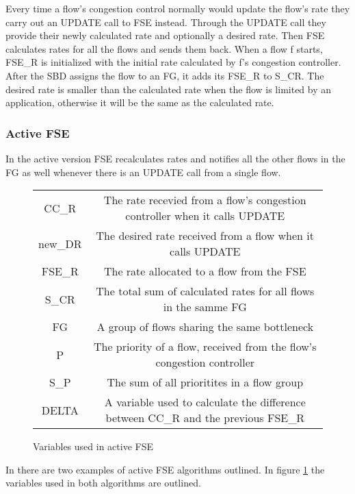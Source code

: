 \documentclass[UKenglish]{ifimaster}
\begin{document}
Every time a flow's congestion control normally would update the flow's rate they carry out an UPDATE call to FSE instead. 
Through the UPDATE call they provide their newly calculated rate and optionally a desired rate. 
Then FSE calculates rates for all the flows and sends them back. 
When a flow f starts, FSE\_R is initialized with the initial rate calculated by f's congestion controller. 
After the SBD assigns the flow to an FG, it adds its FSE\_R to S\_CR.
The desired rate is smaller than the calculated rate when the flow is limited by an application, otherwise it will be the same as the calculated rate.

\subsubsection{Active FSE}
In the active version FSE recalculates rates and notifies all the other flows in the FG as well whenever there is an UPDATE call from a single flow. 

\begin{figure}
\begin{center}
    \begin{tabular}{|c|c|}
        \hline
        CC_R & The rate recevied from a flow's congestion controller when it calls UPDATE \\
        new\_DR & The desired rate received from a flow when it calls UPDATE \\
        FSE\_R & The rate allocated to a flow from the FSE \\
        S\_CR & The total sum of calculated rates for all flows in the samme FG \\ 
        FG & A group of flows sharing the same bottleneck \\
        P & The priority of a flow, received from the flow's congestion controller \\
        S\_P & The sum of all prioritites in a flow group \\
        DELTA & A variable used to calculate the difference between CC\_R and the previous FSE\_R \\  
        \hline
    \end{tabular}
\end{center}
\caption{Variables used in active FSE}
\label{active_fse_variables}
\end{figure}

In \cite{rfc8699} there are two examples of active FSE algorithms outlined.
In figure \ref{active_fse_variables} the variables used in both algorithms are outlined. 
\end{document}

